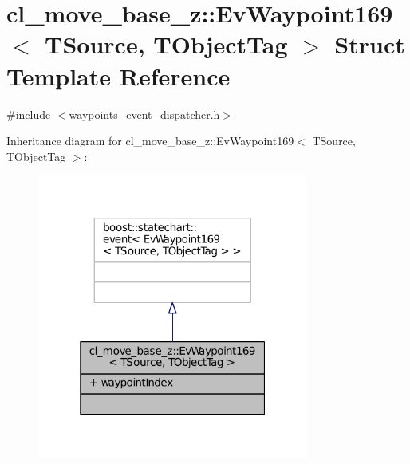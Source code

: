 \hypertarget{structcl__move__base__z_1_1EvWaypoint169}{}\section{cl\+\_\+move\+\_\+base\+\_\+z\+:\+:Ev\+Waypoint169$<$ T\+Source, T\+Object\+Tag $>$ Struct Template Reference}
\label{structcl__move__base__z_1_1EvWaypoint169}


{\ttfamily \#include $<$waypoints\+\_\+event\+\_\+dispatcher.\+h$>$}



Inheritance diagram for cl\+\_\+move\+\_\+base\+\_\+z\+:\+:Ev\+Waypoint169$<$ T\+Source, T\+Object\+Tag $>$\+:
\nopagebreak
\begin{figure}[H]
\begin{center}
\leavevmode
\includegraphics[width=253pt]{structcl__move__base__z_1_1EvWaypoint169__inherit__graph}
\end{center}
\end{figure}


